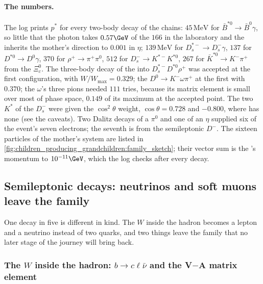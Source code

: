 \paragraph{The numbers.} The log prints $p^*$ for every two-body decay of
the chains: $45\,\mathrm{MeV}$ for $\bar B^{*0}\to\bar B^0\gamma$, so
little that the photon takes $0.57\GeV$ of the $166$ in the laboratory
and the \Bbar inherits the mother's direction to $0.001$ in $\eta$;
$139\,\mathrm{MeV}$ for $D_s^{*-}\to D_s^-\gamma$, $137$ for
$D^{*0}\to D^0\gamma$, $370$ for $\rho^+\to\pi^+\pi^0$, $512$ for
$D_s^-\to K^{*-}K^{*0}$, $267$ for $\bar K^{*0}\to K^-\pi^+$ from the
$\Xi_c^0$. The three-body decay of the \Bbar into $D_s^{*-}D^{*0}\rho^+$
was accepted at the first configuration, with $W/W_{\max}=0.329$; the
$D^0\to K^-\omega\pi^+$ at the first with $0.370$; the $\omega$'s three
pions needed $111$ tries, because its matrix element is small over most
of phase space, $0.149$ of its maximum at the accepted point. The two
$K^*$ of the $D_s^-$ were given the $\cos^2\theta$ weight, $\cos\theta=0.728$
and $-0.800$, where \PYTHIA has none (see the caveats). Two Dalitz decays of a $\pi^0$ and one of an $\eta$ supplied
six of the event's seven electrons; the seventh is from the semileptonic
$D^-$. The sixteen particles of the mother's system are listed in
\cref{fig:children_producing_grandchildren:family_sketch}; their vector
sum is the \Bstarbar's momentum to $10^{-11}\GeV$, which the log checks
after every decay.

\subsection{Semileptonic decays: neutrinos and soft muons leave the family}
\label{sec:children_producing_grandchildren:semileptonic_decays_neutrinos_and_soft_m}

One decay in five is different in kind. The $W$ inside the hadron becomes
a lepton and a neutrino instead of two quarks, and two things leave the
family that no later stage of the journey will bring back.

\subsubsection{The \texorpdfstring{$W$}{W} inside the hadron: \texorpdfstring{$b\to c\ell\bar\nu$}{b -> c l nu} and the V\texorpdfstring{$-$}{-}A matrix element}
\label{sec:children_producing_grandchildren:va}

